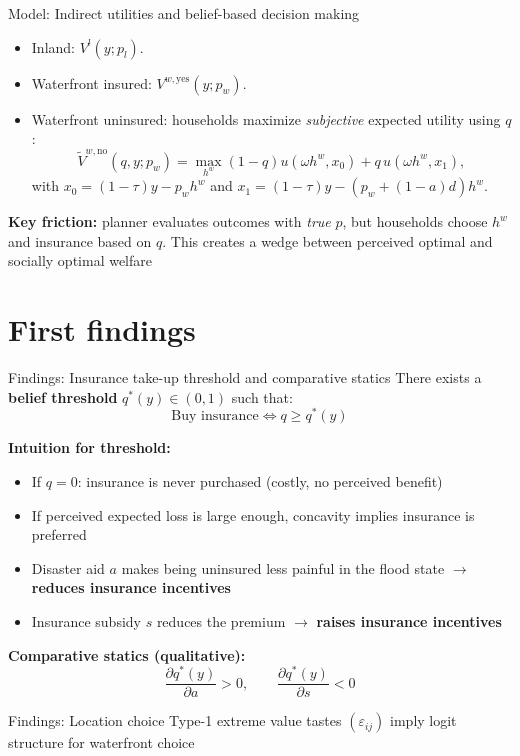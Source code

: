 \documentclass[xcolor=dvipsnames, aspectratio = 169]{beamer}
\begin{document}
{\begin{frame}{Model: Indirect utilities and belief-based decision making}
\begin{itemize}
  \item Inland: $V^l(y; p_l)$.
  \item Waterfront insured: $V^{w,\text{yes}}(y; p_w)$.
  \item Waterfront uninsured: households maximize \emph{subjective} expected utility using $q$:
  \[
  \tilde V^{w,\text{no}}(q,y; p_w) = \max_{h^w} (1-q)u(\omega h^w, x_0) + q\,u(\omega h^w, x_1),
  \]
  with $x_0=(1-\tau)y - p_w h^w$ and $x_1=(1-\tau)y-(p_w+(1-a)d)h^w$.
\end{itemize}

\medskip
\textbf{Key friction:} planner evaluates outcomes with \emph{true} $p$, but households choose $h^w$ and insurance based on $q$. This creates a wedge between perceived optimal and socially optimal welfare

\end{frame}

\section{First findings}

\begin{frame}{Findings: Insurance take-up threshold and comparative statics}
There exists a \textbf{belief threshold} $q^*(y)\in(0,1)$ such that:
\[
\text{Buy insurance} \iff q \ge q^*(y)
\]

\smallskip
\textbf{Intuition for threshold:}
\begin{itemize}
  \item If $q=0$: insurance is never purchased (costly, no perceived benefit)
  \item If perceived expected loss is large enough, concavity implies insurance is preferred
  \item Disaster aid $a$ makes being uninsured less painful in the flood state $\rightarrow$ \textbf{reduces insurance incentives}
  \item Insurance subsidy $s$ reduces the premium $\rightarrow$ \textbf{raises insurance incentives}
\end{itemize}

\medskip
\textbf{Comparative statics (qualitative):}
\[
\frac{\partial q^*(y)}{\partial a} > 0,
\qquad
\frac{\partial q^*(y)}{\partial s} < 0
\]

\end{frame}

\begin{frame}{Findings: Location choice}
Type-1 extreme value tastes $(\varepsilon_{ij})$ imply logit structure for waterfront choice


\end{frame}}
\end{document}
